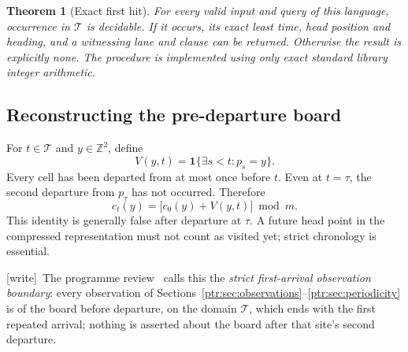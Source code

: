 \documentclass[11pt,letterpaper]{article}
\newtheorem{theorem}{Theorem}[section]
\theoremstyle{definition}\newtheorem{definition}[theorem]{Definition}
\theoremstyle{remark}\newtheorem{remark}[theorem]{Remark}
\newcommand{\Z}{\mathbb Z}\newcommand{\N}{\mathbb N}\newcommand{\Zp}{\mathbb Z_{>0}}
\newcommand{\ind}{\mathbf 1}\newcommand{\dom}{\operatorname{dom}}
\newcommand{\wtag}{\textup{[write]}}
\begin{document}
\begin{theorem}[Exact first hit]\label{ptr:thm:query}
For every valid input and query of this language, occurrence in $\mathcal T$ is decidable. If it occurs, its exact least time, head position and heading, and a witnessing lane and clause can be returned. Otherwise the result is explicitly none. The procedure is implemented using only exact standard library integer arithmetic.
\end{theorem}

\subsection{Reconstructing the pre-departure board}
For $t\in\mathcal T$ and $y\in\Z^2$, define
\[
 V(y,t)=\ind\{\exists s<t:p_s=y\}.
\]
Every cell has been departed from at most once before $t$. Even at $t=\tau$, the second departure from $p_\tau$ has not occurred. Therefore
\begin{equation}\label{ptr:eq:colour}
 c_t(y)=\bigl[c_0(y)+V(y,t)\bigr]\bmod m.
\end{equation}
This identity is generally false after departure at $\tau$. A future head point in the compressed representation must not count as visited yet; strict chronology is essential.

{\small\wtag\ The programme review~\cite{review38} calls this the
\emph{strict first-arrival observation boundary}: every observation of
Sections~\ref{ptr:sec:observations}--\ref{ptr:sec:periodicity} is of the
board before departure, on the domain $\mathcal T$, which ends with the
first repeated arrival; nothing is asserted about the board after that
site's second departure.\par}
\end{document}
